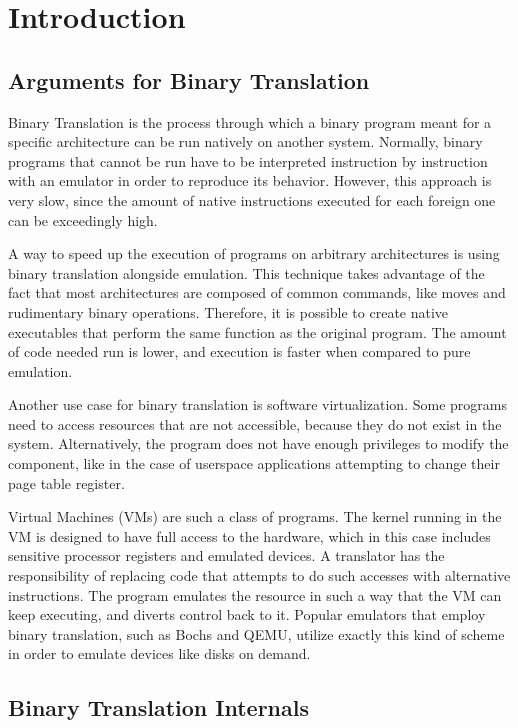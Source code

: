 \section{Introduction}

\subsection{Arguments for Binary Translation}

Binary Translation is the process through which a binary program meant for a
specific architecture can be run natively on another system.  Normally, binary
programs that cannot be run have to be interpreted instruction by instruction
with an emulator in order to reproduce its behavior.  However, this approach is
very slow, since the amount of native instructions executed for each foreign
one can be exceedingly high.

A way to speed up the execution of programs on arbitrary architectures is using
binary translation alongside emulation.  This technique takes advantage of the
fact that most architectures are composed of common commands, like moves and
rudimentary binary operations.  Therefore, it is possible to create native
executables that perform the same function as the original program.  The amount
of code needed run is lower, and execution is faster when compared to pure emulation.

Another use case for binary translation is software virtualization.  Some
programs need to access resources that are not accessible, because they do not
exist in the system.  Alternatively, the program does not have enough
privileges to modify the component, like in the case of userspace applications
attempting to change their page table register.

Virtual Machines (VMs) are such a class of programs.  The kernel running in the
VM is designed to have full access to the hardware, which in this case includes
sensitive processor registers and emulated devices.  A translator has the
responsibility of replacing code that attempts to do such accesses with
alternative instructions.  The program
emulates the resource in such a way that the VM can keep executing, and diverts
control back to it.  Popular emulators that employ binary translation, such as
Bochs and QEMU, utilize exactly this kind of scheme in order to emulate devices
like disks on demand.

\subsection{Binary Translation Internals}

